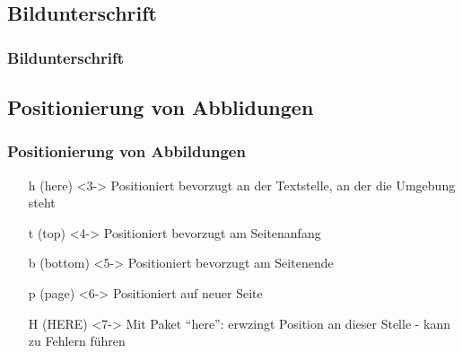 \documentclass{beamer}
\begin{document}
\subsection{Bildunterschrift}
\begin{frame}[fragile]
\frametitle{Bildunterschrift}
  \begin{semiverbatim}
  \end{semiverbatim}
\end{frame}

\subsection{Positionierung von Abblidungen}
\begin{frame}[fragile]
\frametitle{Positionierung von Abbildungen}
  \begin{semiverbatim}
  \end{semiverbatim}
  \begin{itemize}
    \item[h (here)]<3-> Positioniert bevorzugt an der Textstelle, an der die Umgebung steht
    \item[t (top)]<4-> Positioniert bevorzugt am Seitenanfang
    \item[b (bottom)]<5-> Positioniert bevorzugt am Seitenende
    \item[p (page)]<6-> Positioniert auf neuer Seite
    \item[H (HERE)]<7-> Mit Paket "`here"': erwzingt Position an dieser Stelle - kann zu Fehlern führen
  \end{itemize}
\end{frame}
\end{document}
